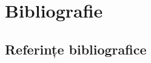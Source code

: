 \chapter{Bibliografie}
\label{chapter:bibliografie}

\section{Referințe bibliografice}
\label{sec:bibliografie-referinte}


